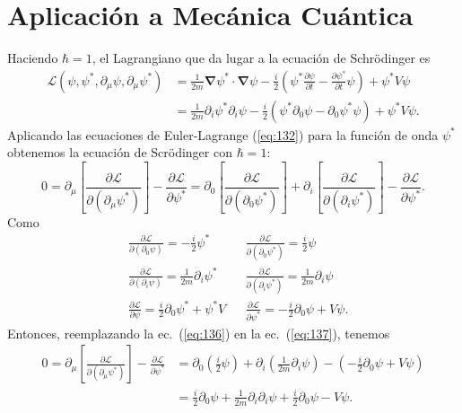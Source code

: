 \section{Aplicaci\'on a Mec\'anica Cu\'antica}
\label{sec:aplic-mecan-cuant}

Haciendo $\hbar=1$, el Lagrangiano que da lugar a la ecuaci\'on de Schr\"odinger es
\begin{align}
\label{eq:5}
  \mathcal{L}(\psi,\psi^*,\partial_\mu\psi,\partial_\mu\psi^*)&=\frac{1}{2m}\boldsymbol{\nabla}\psi^*\cdot\boldsymbol{\nabla}\psi-\frac{i}{2}
  \left(
\psi^*\frac{\partial\psi}{\partial t}-\frac{\partial\psi^*}{\partial t}\psi
  \right)+\psi^*V\psi\\
&=\frac{1}{2m}\partial_i\psi^*\partial_i\psi-\frac{i}{2}
  \left(\psi^*\partial_0\psi-\partial_0\psi^*\psi\right)+\psi^*V\psi.\nonumber
\end{align}
Aplicando las ecuaciones de Euler-Lagrange (\ref{eq:132}) para
la funci\'on de onda $\psi^*$ obtenemos la ecuaci\'on de Scr\"odinger con $\hbar=1$:
\begin{equation}
  \label{eq:137}
    0=\partial_\mu\left[\frac{\partial\mathcal{L}}{\partial(\partial_\mu\psi^*)}\right]-\frac{\partial\mathcal{L}}{\partial\psi^*}=
  \partial_0\left[\frac{\partial\mathcal{L}}{\partial(\partial_0\psi^*)}\right]+  
\partial_i\left[\frac{\partial\mathcal{L}}{\partial(\partial_i\psi^*)}\right]-\frac{\partial\mathcal{L}}{\partial\psi^*}.
\end{equation}
Como
\begin{align}
  \label{eq:136}
  &\frac{\partial\mathcal{L}}{\partial(\partial_0\psi)}=-\frac{i}{2}\psi^*&&\frac{\partial\mathcal{L}}{\partial(\partial_0\psi^*)}=\frac{i}{2}\psi\nonumber\\
  &\frac{\partial\mathcal{L}}{\partial(\partial_i\psi)}=\frac{1}{2m}\partial_i\psi^*&&\frac{\partial\mathcal{L}}{\partial(\partial_i\psi^*)}=\frac{1}{2m}\partial_i\psi\\
  &\frac{\partial\mathcal{L}}{\partial\psi}=\frac{i}{2}\partial_0\psi^*+\psi^*V&&\frac{\partial\mathcal{L}}{\partial\psi^*}=-\frac{i}{2}\partial_0\psi+V\psi.\nonumber
\end{align}
Entonces, reemplazando la ec.~(\ref{eq:136}) en la ec.~(\ref{eq:137}), tenemos
\begin{align}
 0=\partial_\mu\left[\frac{\partial\mathcal{L}}{\partial(\partial_\mu\psi^*)}\right]-\frac{\partial\mathcal{L}}{\partial\psi^*}
 &=\partial_0\left(\frac{i}{2}\psi\right)+\partial_i\left(\frac{1}{2m}\partial_i\psi\right)
  -\left(-\frac{i}{2}\partial_0\psi+V\psi\right)\nonumber\\
  &=\frac{i}{2}\partial_0\psi+\frac{1}{2m}\partial_i\partial_i\psi+\frac{i}{2}\partial_0\psi-V\psi.
\end{align}

